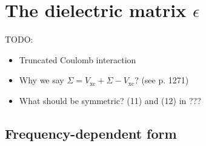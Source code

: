 \documentclass[hyperref, a4paper, 12pt]{report}
\begin{document}
\section{The dielectric matrix $\epsilon$}\label{sec:gw-bse.overview-gw.epsilon}

TODO: 
\begin{itemize}
    \item Truncated Coulomb interaction
    \item Why we say $\Sigma = V_{\text{xc}} + \Sigma - V_{\text{xc}}$?
    (see \cite{berkeleygw} p. 1271)
    \item What should be symmetric? (11) and (12) in \cite{berkeleygw}???
\end{itemize}

\subsection{Frequency-dependent form}
\end{document}
